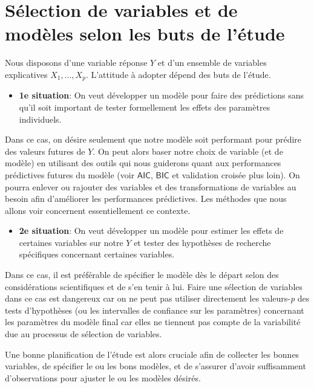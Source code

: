\documentclass[
  11pt,
  letterpaper,
]{book}
\providecommand{\tightlist}{%
  \setlength{\itemsep}{0pt}\setlength{\parskip}{0pt}}\usepackage{longtable,booktabs,array}
\theoremstyle{definition}
\theoremstyle{remark}
\begin{document}
\hypertarget{suxe9lection-de-variables-et-de-moduxe8les-selon-les-buts-de-luxe9tude}{%
\section{Sélection de variables et de modèles selon les buts de
l'étude}\label{suxe9lection-de-variables-et-de-moduxe8les-selon-les-buts-de-luxe9tude}}

Nous disposons d'une variable réponse \(Y\) et d'un ensemble de
variables explicatives \(X_1, \ldots, X_p\). L'attitude à adopter dépend
des buts de l'étude.

\begin{itemize}
\tightlist
\item
  \textbf{1e situation}: On veut développer un modèle pour faire des
  prédictions sans qu'il soit important de tester formellement les
  effets des paramètres individuels.
\end{itemize}

Dans ce cas, on désire seulement que notre modèle soit performant pour
prédire des valeurs futures de \(Y\). On peut alors baser notre choix de
variable (et de modèle) en utilisant des outils qui nous guiderons quant
aux performances prédictives futures du modèle (voir \(\mathsf{AIC}\),
\(\mathsf{BIC}\) et validation croisée plus loin). On pourra enlever ou
rajouter des variables et des transformations de variables au besoin
afin d'améliorer les performances prédictives. Les méthodes que nous
allons voir concernent essentiellement ce contexte.

\begin{itemize}
\tightlist
\item
  \textbf{2e situation}: On veut développer un modèle pour estimer les
  effets de certaines variables sur notre \(Y\) et tester des hypothèses
  de recherche spécifiques concernant certaines variables.
\end{itemize}

Dans ce cas, il est préférable de spécifier le modèle dès le départ
selon des considérations scientifiques et de s'en tenir à lui. Faire une
sélection de variables dans ce cas est dangereux car on ne peut pas
utiliser directement les valeurs-\emph{p} des tests d'hypothèses (ou les
intervalles de confiance sur les paramètres) concernant les paramètres
du modèle final car elles ne tiennent pas compte de la variabilité due
au processus de sélection de variables.

Une bonne planification de l'étude est alors cruciale afin de collecter
les bonnes variables, de spécifier le ou les bons modèles, et de
s'assurer d'avoir suffisamment d'observations pour ajuster le ou les
modèles désirés.
\end{document}
